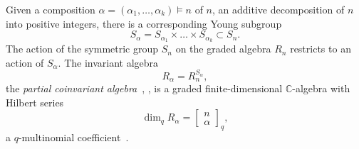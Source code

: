 \documentclass[a4paper,11pt]{amsart}
\theoremstyle{plain}
\theoremstyle{definition}
\newcommand{\C}{\mathbb{C}}
\begin{document}
Given a composition $\alpha=(\alpha_1, \ldots, \alpha_k) \vDash n$ of $n$, an additive decomposition of $n$ into positive integers, there is a corresponding Young subgroup  \[S_\alpha=S_{\alpha_1} \times \ldots \times S_{\alpha_k}\subset S_n.\]
The action of the symmetric group $S_n$ on the graded algebra $R_n$ restricts to an action of $S_\alpha$. The invariant algebra
\[ R_\alpha = R_n^{S_\alpha}, 
\]
the {\em partial coinvariant algebra}~\cite[Sect.~5]{BGG}, \cite[Sect.~2]{MR}, is a graded finite-dimensional $\C$-algebra with Hilbert series
\begin{equation}\label{eq:dimqRalpha} \dim_q R_\alpha = \left[\!\!\begin{array}{c}n\\\alpha\end{array}\!\!\right]_q,
\end{equation}
a $q$-multinomial coefficient~\cite[Lemma 2.1]{Br}. 
\end{document}
